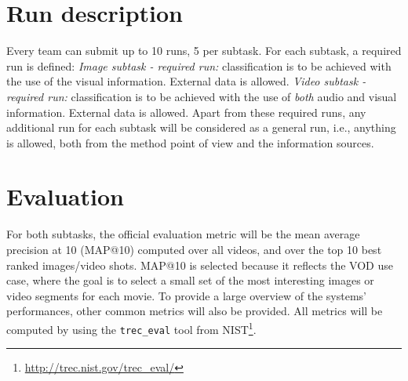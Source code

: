 \documentclass[sigconf]{acmart-me}
\begin{document}

\vspace{-0.2cm}
\section{Run description}

Every team can submit up to 10 runs, 5 per subtask. For each subtask, a required run is defined: \emph{Image subtask - required run:} classification is to be achieved with the use of the visual information. External data is allowed. \emph{Video subtask - required run:} classification is to be achieved with the use of \emph{both} audio and visual information. External data is allowed.
Apart from these required runs, any additional run for each subtask will be considered as a general run, i.e., anything is allowed, both from the method point of view and the information sources. 


\vspace{-0.2cm}
\section{Evaluation}

For both subtasks, the official evaluation metric will be the mean average precision at 10 (MAP@10) computed over all videos, and over the top 10 best ranked images/video shots. MAP@10 is selected because it reflects the VOD use case, where the goal is to select a small set of the most interesting images or video segments for each movie. To provide a large overview of the systems' performances, other common metrics will also be provided. All metrics will be computed by using the \texttt{trec\_eval} tool from
NIST\footnote{\url{http://trec.nist.gov/trec\_eval/}}.
\end{document}
